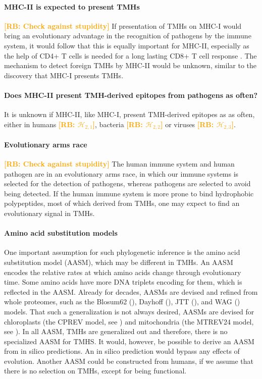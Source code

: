 \documentclass{article}
\newcommand{\richel}[1]{\textcolor{orange}{\textbf{[RB: #1]}}}
\begin{document}
\paragraph{MHC-II is expected to present TMHs}

\richel{Check against stupidity}
If presentation of TMHs on MHC-I would bring an evolutionary advantage 
in the recognition of pathogens by the immune system, 
it would follow that this is equally important for MHC-II, 
especially as the help of CD4+ T cells is needed for a long lasting CD8+ T cell 
response \cite{novy2007cd4}. 
The mechanism to detect foreign TMHs by MHC-II would be unknown, 
similar to the discovery that MHC-I presents TMHs.

\paragraph{Does MHC-II present TMH-derived epitopes from pathogens as often?}

It is unknown if MHC-II, like MHC-I, 
present TMH-derived epitopes as as often, either 
in humans \richel{$\mathcal{H}_{2,1}$},
bacteria \richel{$\mathcal{H}_{2,2}$}
or viruses \richel{$\mathcal{H}_{2,3}$}.

\paragraph{Evolutionary arms race}

\richel{Check against stupidity}
The human immune system and human pathogen are in an evolutionary
arms race, in which our immune systems is selected for the detection
of pathogens, whereas pathogens are selected to avoid being detected.
If the human immune system is more prone to bind hydrophobic polypeptides, 
most of which derived from TMHs, one may expect to find 
an evolutionary signal in TMHs.

\paragraph{Amino acid substitution models}

One important assumption for such phylogenetic inference
is the amino acid substitution model (AASM), which may be different
in TMHs. An AASM encodes the relative rates at which amino acids
change through evolutionary time. Some amino acids have more 
DNA triplets encoding for them, which is reflected in the AASM.
Already for decades, AASMs are devised and refined from whole proteomes,
such as the Blosum62 (\cite{henikoff1992amino}), 
Dayhoff (\cite{dayhoff197822}), JTT (\cite{jones1992rapid}), 
and WAG (\cite{whelan2001general}) models. 
That such a generalization
is not always desired, AASMs are devised for 
chloroplasts (the CPREV model, see \cite{adachi2000plastid})
and mitochondria (the MTREV24 model, see \cite{adachi1996model}).
In all AASM, TMHs are generalized out and therefore, 
there is no specialized AASM for TMHS. It would, however,
be possible to derive an AASM from in silico predictions. 
An in silico prediction would bypass any effects of evolution.
Another AASM could be constructed from humans, if we assume
that there is no selection on TMHs, except for being functional.
\end{document}
